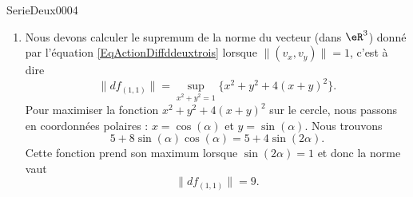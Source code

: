 \begin{corrige}{SerieDeux0004}
\begin{enumerate}
		\item
			Nous devons calculer le supremum de la norme du vecteur (dans $\eR^3$) donné par l'équation \eqref{EqActionDiffddeuxtrois} lorsque $\| (v_x,v_y) \|=1$, c'est à dire
			\begin{equation}
				\| df_{(1,1)} \|=\sup_{x^2+y^2=1}\{ x^2+y^2+4(x+y)^2 \}.
			\end{equation}
			Pour maximiser la fonction $x^2+y^2+4(x+y)^2$ sur le cercle, nous passons en coordonnées polaires : $x=\cos(\alpha)$ et $y=\sin(\alpha)$. Nous trouvons
			\begin{equation}
				5+8\sin(\alpha)\cos(\alpha)=5+4\sin(2\alpha).
			\end{equation}
			Cette fonction prend son maximum lorsque $\sin(2\alpha)=1$ et donc la norme vaut
			\begin{equation}
				\| df_{(1,1)} \|=9.
			\end{equation}

	\end{enumerate}

\end{corrige}
